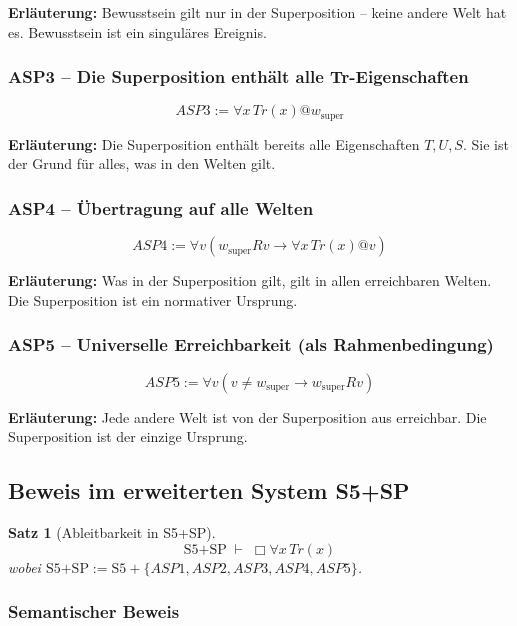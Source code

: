 \documentclass[
]{article}
\newtheorem{theorem}{Satz}
\begin{document}
\textbf{Erläuterung:} Bewusstsein gilt nur in der Superposition – keine andere Welt hat es. Bewusstsein ist ein singuläres Ereignis.

\subsubsection{ASP3 – Die Superposition enthält alle Tr-Eigenschaften}

\[
\boxed{ASP3 := \forall x\,Tr(x) @ w_{\text{super}}}
\]

\textbf{Erläuterung:} Die Superposition enthält bereits alle Eigenschaften \(T, U, S\). Sie ist der Grund für alles, was in den Welten gilt.

\subsubsection{ASP4 – Übertragung auf alle Welten}

\[
\boxed{ASP4 := \forall v (w_{\text{super}} R v \rightarrow \forall x\,Tr(x) @ v)}
\]

\textbf{Erläuterung:} Was in der Superposition gilt, gilt in allen erreichbaren Welten. Die Superposition ist ein normativer Ursprung.

\subsubsection{ASP5 – Universelle Erreichbarkeit (als Rahmenbedingung)}

\[
\boxed{ASP5 := \forall v (v \neq w_{\text{super}} \rightarrow w_{\text{super}} R v)}
\]

\textbf{Erläuterung:} Jede andere Welt ist von der Superposition aus erreichbar. Die Superposition ist der einzige Ursprung.

\subsection{Beweis im erweiterten System S5+SP}

\begin{theorem}[Ableitbarkeit in S5+SP]
\[
\boxed{
\text{S5+SP} \;\vdash\; \Box\forall x\,Tr(x)
}
\]
wobei \(\text{S5+SP} := \text{S5} + \{ASP1, ASP2, ASP3, ASP4, ASP5\}\).
\end{theorem}

\subsubsection{Semantischer Beweis}
\end{document}
